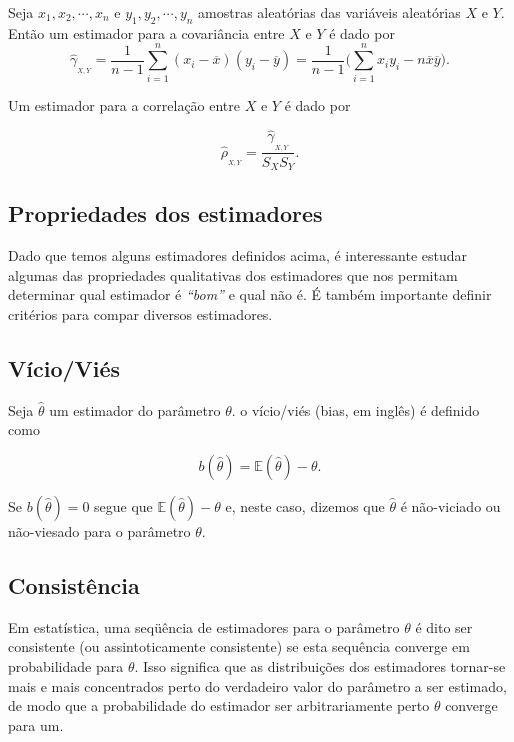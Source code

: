\documentclass[
]{book}
\theoremstyle{definition}
\theoremstyle{definition}
\theoremstyle{definition}
\theoremstyle{remark}
\begin{document}
Seja \(x_1,x_2,\cdots,x_n\) e \(y_1,y_2,\cdots,y_n\) amostras aleatórias das variáveis
aleatórias \(X\) e \(Y\). Então um estimador para a covariância entre \(X\) e \(Y\) é dado por
\[\hat{ \gamma}_{_{X,Y}}=\frac{1}{n-1}\sum_{i=1}^{n}(x_i-\overline{x})(y_i-\overline{y})=\frac1{n-1}\bigg(\sum_{i=1}^{n}x_iy_i-n\overline{x}\overline{y}\bigg).\]

Um estimador para a correlação entre \(X\) e \(Y\) é dado por

\[\hat{\rho}_{_{X,Y}} = \frac{\hat{ \gamma}_{_{X,Y}}}{S_XS_Y}.\]

\hypertarget{propriedades-dos-estimadores}{%
\subsection{Propriedades dos estimadores}\label{propriedades-dos-estimadores}}

Dado que temos alguns estimadores definidos acima, é interessante estudar algumas
das propriedades qualitativas dos estimadores que nos permitam determinar qual estimador é \emph{``bom''} e qual não é. É também importante definir critérios para compar diversos estimadores.

\hypertarget{vuxedcioviuxe9s}{%
\subsection{Vício/Viés}\label{vuxedcioviuxe9s}}

Seja \(\hat{\theta}\) um estimador do parâmetro \(\theta\). o vício/viés (bias, em inglês) é definido como

\begin{equation}
 b(\hat{\theta})=\mathbb{E}(\hat{\theta})-\theta.
 \label{eq:vies}
\end{equation}

Se \(b(\hat\theta)=0\) segue que \(\mathbb{E}(\hat{\theta})-\theta\) e, neste caso, dizemos que \(\hat\theta\) é não-viciado ou não-viesado para o parâmetro \(\theta\).

\hypertarget{consistuxeancia}{%
\subsection{Consistência}\label{consistuxeancia}}

Em estatística, uma seqüência de estimadores para o parâmetro \(\theta\) é dito ser consistente (ou assintoticamente consistente) se esta sequência converge em probabilidade para \(\theta\). Isso significa que as distribuições dos estimadores tornar-se mais e mais concentrados perto do verdadeiro valor do parâmetro a ser estimado, de modo que a probabilidade do estimador ser arbitrariamente perto \(\theta\) converge para um.
\end{document}
